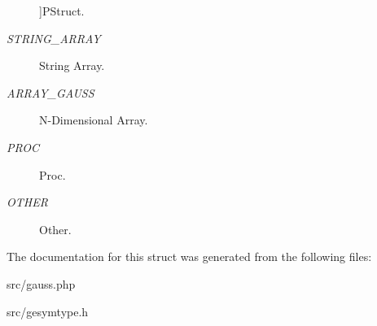 \begin{Desc}
\begin{description}
{}]P\-Struct. \item[{\em 
\hypertarget{class_g_e_sym_type_a05477e08255bea70296f7825493e95fcadba1b6c2cd5c27167323652b1c23c9e0}{S\-T\-R\-I\-N\-G\-\_\-\-A\-R\-R\-A\-Y}\label{class_g_e_sym_type_a05477e08255bea70296f7825493e95fcadba1b6c2cd5c27167323652b1c23c9e0}
}]String Array. \item[{\em 
\hypertarget{class_g_e_sym_type_a05477e08255bea70296f7825493e95fcad3f85fecfcee857d9b08cf4ebe77c32f}{A\-R\-R\-A\-Y\-\_\-\-G\-A\-U\-S\-S}\label{class_g_e_sym_type_a05477e08255bea70296f7825493e95fcad3f85fecfcee857d9b08cf4ebe77c32f}
}]N-\/\-Dimensional Array. \item[{\em 
\hypertarget{class_g_e_sym_type_a05477e08255bea70296f7825493e95fca4793088111ff7058b2bd6e4bde07f816}{P\-R\-O\-C}\label{class_g_e_sym_type_a05477e08255bea70296f7825493e95fca4793088111ff7058b2bd6e4bde07f816}
}]Proc. \item[{\em 
\hypertarget{class_g_e_sym_type_a05477e08255bea70296f7825493e95fca7d507081df635250120e56c8766ec504}{O\-T\-H\-E\-R}\label{class_g_e_sym_type_a05477e08255bea70296f7825493e95fca7d507081df635250120e56c8766ec504}
}]Other. \end{description}
\end{Desc}


The documentation for this struct was generated from the following files\-:\begin{DoxyCompactItemize}
\item 
src/gauss.\-php\item 
src/gesymtype.\-h\end{DoxyCompactItemize}
